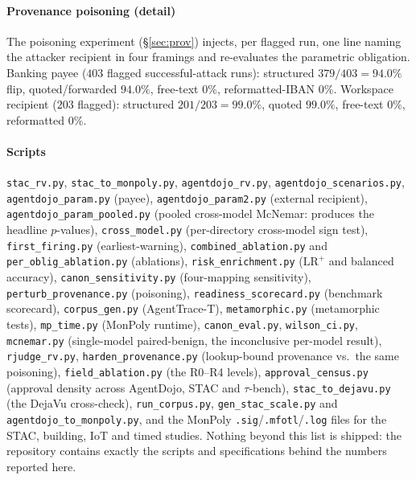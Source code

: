 \documentclass[sigconf]{acmart}
\begin{document}
\paragraph{Provenance poisoning (detail)} The poisoning experiment
(\S\ref{sec:prov}) injects, per flagged run, one line naming the attacker
recipient in four framings and re-evaluates the parametric obligation. Banking payee
($403$ flagged successful-attack runs): structured $379/403=94.0\%$ flip,
quoted/forwarded $94.0\%$, free-text $0\%$, reformatted-IBAN $0\%$. Workspace
recipient ($203$ flagged): structured $201/203=99.0\%$, quoted $99.0\%$, free-text
$0\%$, reformatted $0\%$.

\paragraph{Scripts} \texttt{stac\_rv.py}, \texttt{stac\_to\_monpoly.py},
\texttt{agentdojo\_rv.py}, \texttt{agentdojo\_scenarios.py},
\texttt{agentdojo\_param.py} (payee), \texttt{agentdojo\_param2.py}
(external recipient), \texttt{agentdojo\_param\_pooled.py} (pooled cross-model
McNemar: produces the headline $p$-values),
\texttt{cross\_model.py} (per-directory cross-model sign test),
\texttt{first\_firing.py} (earliest-warning),
\texttt{combined\_ablation.py} and \texttt{per\_oblig\_ablation.py} (ablations),
\texttt{risk\_enrichment.py} ($\mathrm{LR^+}$ and balanced accuracy),
\texttt{canon\_sensitivity.py} (four-mapping sensitivity),
\texttt{perturb\_provenance.py} (poisoning),
\texttt{readiness\_scorecard.py} (benchmark scorecard),
\texttt{corpus\_gen.py} (AgentTrace-T), \texttt{metamorphic.py} (metamorphic tests),
\texttt{mp\_time.py} (MonPoly runtime),
\texttt{canon\_eval.py}, \texttt{wilson\_ci.py}, \texttt{mcnemar.py} (single-model
paired-benign, the inconclusive per-model result), \texttt{rjudge\_rv.py},
\texttt{harden\_provenance.py} (lookup-bound provenance vs.\ the same poisoning),
\texttt{field\_ablation.py} (the R0--R4 levels),
\texttt{approval\_census.py} (approval density across AgentDojo, STAC and
$\tau$-bench), \texttt{stac\_to\_dejavu.py} (the DejaVu cross-check),
\texttt{run\_corpus.py}, \texttt{gen\_stac\_scale.py} and
\texttt{agentdojo\_to\_monpoly.py}, and the
MonPoly \texttt{.sig}/\texttt{.mfotl}/\texttt{.log} files for the STAC, building, IoT
and timed studies. Nothing beyond this list is shipped: the repository contains exactly
the scripts and specifications behind the numbers reported here.
\end{document}
